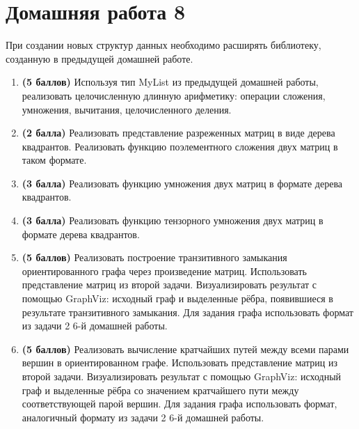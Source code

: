 \section{Домашняя работа 8}

При создании новых структур данных необходимо расширять библиотеку, созданную в предыдущей домашней работе.

\begin{enumerate}

    \item \textbf{(5 баллов)} Используя тип MyList из предыдущей домашней работы, реализовать целочисленную длинную арифметику: операции сложения, умножения, вычитания, целочисленного деления. 

    \item \textbf{(2 балла)} Реализовать представление разреженных матриц в виде дерева квадрантов. Реализовать функцию поэлементного сложения двух матриц в таком формате.
    
    \item \textbf{(3 балла)} Реализовать функцию умножения двух матриц в формате дерева квадрантов.
    
    \item \textbf{(3 балла)} Реализовать функцию тензорного умножения двух матриц в формате дерева квадрантов.
    
    \item \textbf{(5 баллов)} Реализовать построение транзитивного замыкания ориентированного графа через произведение матриц. Использовать представление матриц из второй задачи. Визуализировать результат с помощью GraphViz: исходный граф и выделенные рёбра, появившиеся в результате транзитивного замыкания. Для задания графа использовать формат из задачи 2 6-й домашней работы.
    
    \item \textbf{(5 баллов)} Реализовать вычисление кратчайших путей между всеми парами вершин в ориентированном графе. Использовать представление матриц из второй задачи. Визуализировать результат с помощью GraphViz: исходный граф и выделенные рёбра со значением кратчайшего пути между соответствующей парой вершин. Для задания графа использовать формат, аналогичный формату из задачи 2 6-й домашней работы.
\end{enumerate}